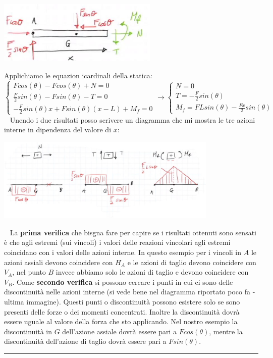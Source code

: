 \begin{center}
    \includegraphics[height=3cm]{../lezione7/img11.JPG}
\end{center}
Applichiamo le equazion icardinali della statica:
\[
    \begin{cases}
        F cos(\theta) - F cos(\theta) + N = 0\\
        \frac{F}{2} sin(\theta) - F sin(\theta) - T = 0\\
        - \frac{F}{2} sin(\theta) x + F sin(\theta) (x-L) + M_f = 0
    \end{cases} \rightarrow  \begin{cases}
        N = 0\\
        T = - \frac{F}{2} sin(\theta)\\
        M_f = F L sin(\theta) - \frac{F x}{2} sin(\theta)
    \end{cases}
\]
\ \newline
Unendo i due risultati posso scrivere un diagramma che mi mostra le tre azioni interne in dipendenza del valore di $x$:
\begin{center}
    \includegraphics[height=4cm]{../lezione7/img12.JPG}
\end{center}
\ \newline
La \textbf{prima verifica} che bisgna fare per capire se i risultati ottenuti sono sensati è che agli estremi (sui vincoli) i valori delle reazioni vincolari agli estremi coincidano con i valori delle azioni interne. In questo esempio per i vincoli in $A$ le azioni assiali devono coincidere con $H_A$ e le azioni di taglio devono coincidere con $V_A$, nel punto $B$ invece abbiamo solo le azioni di taglio e devono coincidere con $V_B$.\newline
\newline
Come \textbf{secondo verifica} si possono cercare i punti in cui ci sono delle discontinuità nelle azioni interne (si vede bene nel diagramma riportato poco fa - ultima immagine). Questi punti o discontinuità possono esistere solo se sono presenti delle forze o dei momenti concentrati. Inoltre la discontinuità dovrà essere uguale al valore della forza che sto applicando. Nel nostro esempio la discontinuità in $G$ dell'azione assiale dovrà essere pari a $F cos(\theta)$, mentre la discontinuità dell'azione di taglio dovrà essere pari a $F sin(\theta)$.\newline
\rule{\textwidth}{0,4pt}